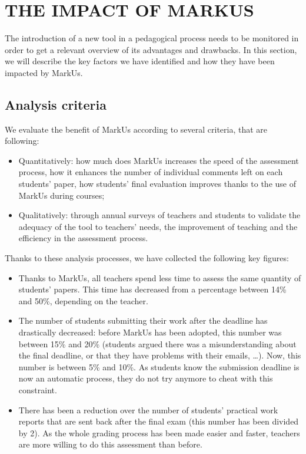 \documentclass[twocolumn,10pt]{asme2e}
\begin{document}
\section*{THE IMPACT OF MARKUS}

The introduction of a new tool in a pedagogical process needs to be monitored in order to get a relevant overview of its advantages and drawbacks. In this section, we will describe the key factors we have identified and how they have been impacted by MarkUs. 


\subsection*{Analysis criteria}

We evaluate the benefit of MarkUs according to several criteria, that are following: 
\begin{itemize}
\item Quantitatively: how much does MarkUs increases the speed of the assessment process, how it enhances the number of individual comments left on each students' paper, how students' final evaluation improves thanks to the use of MarkUs during courses;
\item Qualitatively: through annual surveys of teachers and students to validate the adequacy of the tool to teachers' needs, the improvement of teaching and the efficiency in the assessment process.
\end{itemize}

Thanks to these analysis processes, we have collected the following key figures: 
\begin{itemize}
\item Thanks to MarkUs, all teachers spend less time to assess the same quantity of students' papers. This time has decreased from a percentage between 14\% and 50\%, depending on the teacher. 
\item The number of students submitting their work after the deadline has drastically decreased: before MarkUs has been adopted, this number was between 15\% and 20\% (students argued there was a misunderstanding about the final deadline, or that they have problems with their emails, \dots).  Now, this number is between 5\% and 10\%. As students know the submission deadline is now an automatic process, they do not try anymore to cheat with this constraint. 
\item There has been a reduction over the number of students' practical work reports that are sent back after the final exam (this number has been divided by 2). As the whole grading process has been made easier and faster, teachers are more willing to do this assessment than before. 
\end{itemize}
\end{document}
